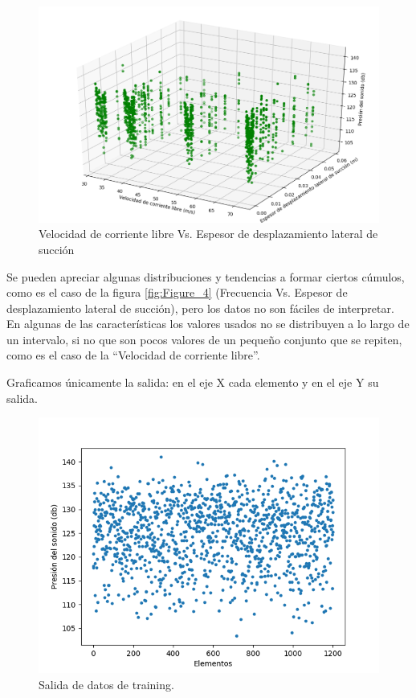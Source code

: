\documentclass[12pt,spanish]{article} %
\begin{document}
\begin{figure}[H]
  \begin{center}
  \includegraphics[scale=.6]{Figure_10}
  \caption{Velocidad de corriente libre Vs. Espesor de desplazamiento lateral de succión}
  \label{fig:Figure_10}
  \end{center}
\end{figure}

Se pueden apreciar algunas distribuciones y tendencias a formar ciertos cúmulos, como es el caso de la figura \ref{fig:Figure_4} (Frecuencia Vs. Espesor de desplazamiento lateral de succión), pero los datos no son fáciles de interpretar. En algunas de las características los valores usados no se distribuyen a lo largo de un intervalo, si no que son pocos valores de un pequeño conjunto que se repiten, como es el caso de la ``Velocidad de corriente libre''.

Graficamos únicamente la salida: en el eje X cada elemento y en el eje Y su salida.

\begin{figure}[H]
  \begin{center}
  \includegraphics[scale=0.9]{s1}
  \caption{Salida de datos de training.}
  \label{fig:s1}
  \end{center}
\end{figure}
\end{document}
